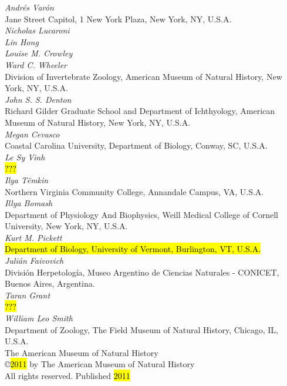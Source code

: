 \documentclass[11pt]{book}
\begin{document}
\begin{flushleft}
    \small
{\it
Andr\'es Var\'on}\\
Jane Street Capitol, 1 New York Plaza, New York, NY, U.S.A. \\
\smallskip 
{\it
Nicholas Lucaroni\\
Lin Hong \\
Louise M. Crowley \\
Ward C. Wheeler \\
}
Division of Invertebrate Zoology, American Museum of Natural History, New York, NY, U.S.A.\\
{\it
John S. S. Denton\\
}
Richard Gilder Graduate School and Department of Ichthyology, American Museum of Natural History, New York, NY, U.S.A.\\
\smallskip
{\it
Megan Cevasco} \\
Coastal Carolina University, Department of Biology, Conway, SC, U.S.A. \\
\smallskip
{\it
Le Sy Vinh}\\
\hl{???} \\
{\it
Ilya T\"emkin} \\
Northern Virginia Community College, Annandale Campus, VA, U.S.A. \\
\smallskip
{\it
Illya Bomash}\\
Department of Physiology And Biophysics, Weill Medical College of Cornell University, New York, NY, U.S.A.\\
\smallskip
{\it
Kurt M. Pickett}\\
\hl{Department of Biology, University of Vermont, Burlington, VT, U.S.A.} \\
\smallskip
{\it
Juli\'an Faivovich}\\
Divisi\'on Herpetolog\'ia, Museo Argentino de Ciencias Naturales - CONICET, Buenos Aires, Argentina.\\
\smallskip
{\it
Taran Grant}\\
\hl{???} \\
\smallskip
{\it
William Leo Smith}\\
Department of Zoology, The Field Museum of Natural History, Chicago, IL, U.S.A.\\

\vspace*{0.25cm}
The American Museum of Natural History\\
\copyright \hl {2011} by The American Museum of Natural History \\
All rights reserved. Published \hl{2011}


\end{flushleft}
\end{document}
